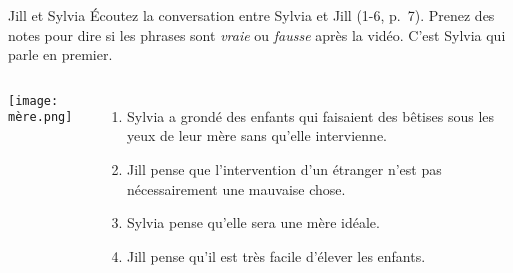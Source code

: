\begin{frame}{Jill et Sylvia}
  Écoutez la conversation entre Sylvia et Jill (1-6, p.~7).
  Prenez des notes pour dire si les phrases sont \emph{vraie} ou \emph{fausse} après la vidéo.
  C'est Sylvia qui parle en premier.
  \begin{columns}
      \begin{center}
        \texttt{[image: mère.png]}
      \end{center}
      \begin{enumerate}
        \item Sylvia a grondé des enfants qui faisaient des bêtises sous les yeux de leur mère sans qu'elle intervienne.
        \item Jill pense que l'intervention d'un étranger n'est pas nécessairement une mauvaise chose. 
        \item Sylvia pense qu'elle sera une mère idéale.
        \item Jill pense qu'il est très facile d'élever les enfants.
      \end{enumerate}
  \end{columns}
\end{frame}